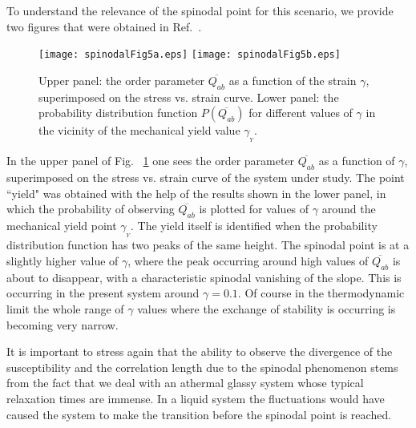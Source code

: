\documentclass[9pt,twocolumn,twoside]{pnas-new}
\begin{document}
To understand the relevance of the spinodal point for this scenario, we provide two figures that
were obtained in Ref.~\cite{16JPRS}.
\begin{figure}[h!]
\begin{center}
\texttt{[image: spinodalFig5a.eps]}
  \texttt{[image: spinodalFig5b.eps]}
\caption{Upper panel: the order parameter $\overline{Q_{ab}}$ as a function of the strain $\gamma$,
superimposed on the stress vs. strain curve. Lower panel: the probability distribution function
$P(\overline{Q_{ab}})$ for different values of $\gamma$ in the vicinity of the mechanical yield value $\gamma_{_{Y}}$.}
\label{phasetran}
\end{center}
\end{figure}
In the upper panel of Fig. ~\ref{phasetran} one sees the order parameter $\overline{Q_{ab}}$ as a function
of $\gamma$, superimposed on the stress vs. strain curve of the system under study. The point ``yield" was
obtained with the help of the results shown in the lower panel, in which the probability of observing
$\overline{Q_{ab}}$ is plotted for values of $\gamma$ around the mechanical yield point  $\gamma_{_{Y}}$. The
yield itself is identified when the probability distribution function has two peaks of the same height. The spinodal point is at a slightly higher value of $\gamma$, where the peak occurring around high values
of $\overline{Q_{ab}}$ is about to disappear, with a characteristic spinodal vanishing of the slope. This
is occurring in the present system around $\gamma=0.1$. Of course in the thermodynamic limit the whole
range of $\gamma$ values where the exchange of stability is occurring is becoming very narrow.

It is important to stress again that the ability to observe the divergence of the susceptibility and the
correlation length due to the spinodal phenomenon stems from the fact that we deal with an athermal glassy system
whose typical relaxation times are immense. In a liquid system the fluctuations would have caused the system to make the transition before the spinodal point is reached.
\end{document}
